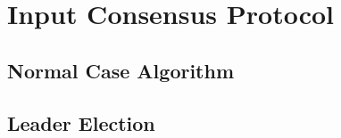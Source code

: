 \section{Input Consensus Protocol} \label{sec:input}

\subsection{Normal Case Algorithm} \label{sec:normal}

\subsection{Leader Election} \label{sec:election}
